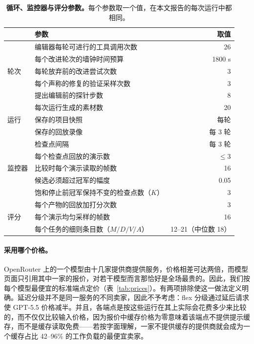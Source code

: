 \begin{table}[htbp]
\caption{\textbf{循环、监控器与评分参数。}每个参数取一个值，在本文报告的每次运行中都相同。}
\label{tab:params}
\centering\small
\begin{tabular}{@{}llr@{}}
\toprule
& 参数 & 取值 \\
\midrule
\multirow{5}{*}{轮次} & 编辑器每轮可进行的工具调用次数 & 26 \\
& 每个改进轮次的墙钟时间预算 & 1800 s \\
& 每轮放弃前的改进尝试次数 & 3 \\
& 每个声称的修复的验证采样次数 & 3 \\
& 提出编辑前的探针步数 & 8 \\
\midrule
\multirow{3}{*}{运行} & 每次运行生成的素材数 & 20 \\
& 保存的项目快照 & 每轮 \\
& 保存的回放录像 & 每 3 轮 \\
\midrule
\multirow{5}{*}{监控器} & 检查点间隔 & 每 3 轮 \\
& 每个检查点回放的演示数 & $\leq$3 \\
& 比较时每个演示读取的帧数 & 16 \\
& 候选必须超过冠军的幅度 & 0.05 \\
& 饱和停止前冠军保持不变的检查点数（$K$） & 3 \\
\midrule
\multirow{3}{*}{评分} & 每个产物的回放加打分次数 & 3 \\
& 每个演示均匀采样的帧数 & 16 \\
& 每个任务的细则条目数（$M/D/V/A$） & 12–21（中位数 18） \\
\bottomrule
\end{tabular}
\end{table}

\paragraph{采用哪个价格。}OpenRouter 上的一个模型由十几家提供商提供服务，价格相差可达两倍，而模型页面只引用其中一家的报价，对若干模型而言那恰好是全场最贵的。因此，我们按每个模型最便宜的标准端点定价（表~\ref{tab:prices}）。有两项排除使这一做法定义明确。延迟分级并不是同一服务的不同卖家，因此不予考虑：flex 分级通过延后请求使 GPT-5.5 价格减半。并且，各端点是按这些运行在其上实际会花费多少来比较的，而不仅仅比较输入价格，因为报价中缓存价格为零意味着该端点不提供提示缓存，而不是缓存读取免费——若按字面理解，一家不提供缓存的提供商就会成为一个缓存占比 42–96\% 的工作负载的最便宜卖家。


